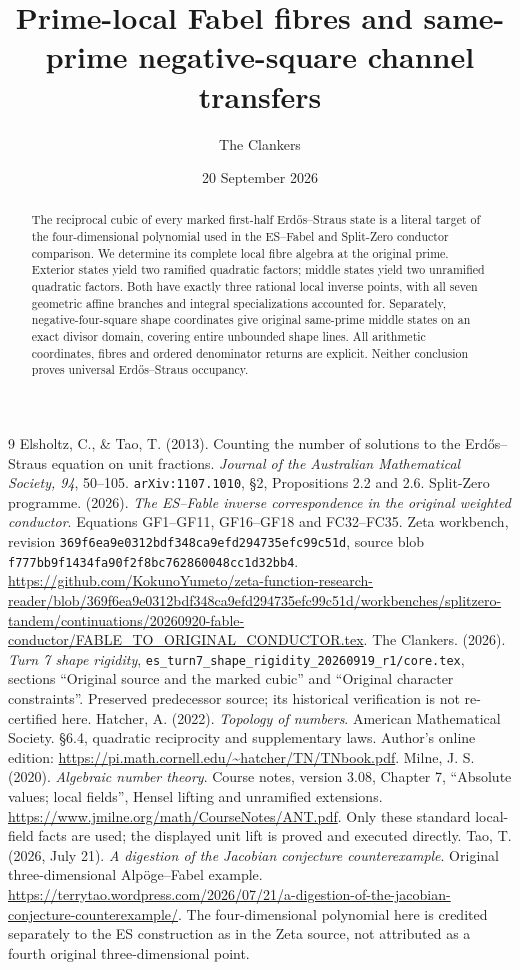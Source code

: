 \documentclass[11pt,reqno]{amsart}
\title[Prime-local Fabel fibres and channel transfer]{Prime-local Fabel fibres and same-prime negative-square channel transfers}
\author{The Clankers}
\date{20 September 2026}
\begin{document}
\begin{abstract}
The reciprocal cubic of every marked first-half Erd\H{o}s--Straus state is a
literal target of the four-dimensional polynomial used in the ES--Fabel and
Split-Zero conductor comparison. We determine its complete local fibre algebra
at the original prime. Exterior states yield two ramified quadratic factors;
middle states yield two unramified quadratic factors. Both have exactly three
rational local inverse points, with all seven geometric affine branches and
integral specializations accounted for. Separately, negative-four-square shape
coordinates give original same-prime middle states on an exact divisor domain,
covering entire unbounded shape lines. All arithmetic coordinates, fibres and
ordered denominator returns are explicit. Neither conclusion proves universal
Erd\H{o}s--Straus occupancy.
\end{abstract}
\maketitle
\begin{thebibliography}{9}
 Elsholtz, C., \& Tao, T. (2013). Counting the number of solutions
to the Erd\H{o}s--Straus equation on unit fractions. \emph{Journal of the Australian
Mathematical Society, 94}, 50--105. \texttt{arXiv:1107.1010}, \S2,
Propositions 2.2 and 2.6.
 Split-Zero programme. (2026). \emph{The ES--Fable inverse
correspondence in the original weighted conductor}. Equations GF1--GF11,
GF16--GF18 and FC32--FC35. Zeta workbench, revision
\texttt{369f6ea9e0312bdf348ca9efd294735efc99c51d}, source blob
\texttt{f777bb9f1434fa90f2f8bc762860048cc1d32bb4}.
\url{https://github.com/KokunoYumeto/zeta-function-research-reader/blob/369f6ea9e0312bdf348ca9efd294735efc99c51d/workbenches/splitzero-tandem/continuations/20260920-fable-conductor/FABLE_TO_ORIGINAL_CONDUCTOR.tex}.
 The Clankers. (2026). \emph{Turn 7 shape rigidity},
\texttt{es\_turn7\_shape\_rigidity\_20260919\_r1/core.tex}, sections
``Original source and the marked cubic'' and ``Original character constraints''.
Preserved predecessor source; its historical verification is not re-certified here.
 Hatcher, A. (2022). \emph{Topology of numbers}.
American Mathematical Society. \S6.4, quadratic reciprocity and supplementary laws.
Author's online edition: \url{https://pi.math.cornell.edu/~hatcher/TN/TNbook.pdf}.
 Milne, J. S. (2020). \emph{Algebraic number theory}.
Course notes, version 3.08, Chapter 7, ``Absolute values; local fields'', Hensel lifting and
unramified extensions. \url{https://www.jmilne.org/math/CourseNotes/ANT.pdf}.
Only these standard local-field facts are used; the displayed unit lift is proved
and executed directly.
 Tao, T. (2026, July 21). \emph{A digestion of the Jacobian conjecture
counterexample}. Original three-dimensional Alp\"oge--Fabel example.
\url{https://terrytao.wordpress.com/2026/07/21/a-digestion-of-the-jacobian-conjecture-counterexample/}.
The four-dimensional polynomial here is credited separately to the ES construction
as in the Zeta source, not attributed as a fourth original three-dimensional point.
\end{thebibliography}
\end{document}
